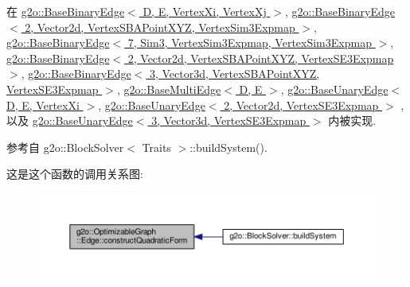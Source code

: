 在 \hyperlink{classg2o_1_1BaseBinaryEdge_a06a18745d95017c6d3c841f838a65364}{g2o\-::\-Base\-Binary\-Edge$<$ D, E, Vertex\-Xi, Vertex\-Xj $>$}, \hyperlink{classg2o_1_1BaseBinaryEdge_a06a18745d95017c6d3c841f838a65364}{g2o\-::\-Base\-Binary\-Edge$<$ 2, Vector2d, Vertex\-S\-B\-A\-Point\-X\-Y\-Z, Vertex\-Sim3\-Expmap $>$}, \hyperlink{classg2o_1_1BaseBinaryEdge_a06a18745d95017c6d3c841f838a65364}{g2o\-::\-Base\-Binary\-Edge$<$ 7, Sim3, Vertex\-Sim3\-Expmap, Vertex\-Sim3\-Expmap $>$}, \hyperlink{classg2o_1_1BaseBinaryEdge_a06a18745d95017c6d3c841f838a65364}{g2o\-::\-Base\-Binary\-Edge$<$ 2, Vector2d, Vertex\-S\-B\-A\-Point\-X\-Y\-Z, Vertex\-S\-E3\-Expmap $>$}, \hyperlink{classg2o_1_1BaseBinaryEdge_a06a18745d95017c6d3c841f838a65364}{g2o\-::\-Base\-Binary\-Edge$<$ 3, Vector3d, Vertex\-S\-B\-A\-Point\-X\-Y\-Z, Vertex\-S\-E3\-Expmap $>$}, \hyperlink{classg2o_1_1BaseMultiEdge_ae44ba0385d4dda4bc038d81e50cadd8c}{g2o\-::\-Base\-Multi\-Edge$<$ D, E $>$}, \hyperlink{classg2o_1_1BaseUnaryEdge_ad7e6dc44c571be159f066bdb961ade2b}{g2o\-::\-Base\-Unary\-Edge$<$ D, E, Vertex\-Xi $>$}, \hyperlink{classg2o_1_1BaseUnaryEdge_ad7e6dc44c571be159f066bdb961ade2b}{g2o\-::\-Base\-Unary\-Edge$<$ 2, Vector2d, Vertex\-S\-E3\-Expmap $>$} , 以及 \hyperlink{classg2o_1_1BaseUnaryEdge_ad7e6dc44c571be159f066bdb961ade2b}{g2o\-::\-Base\-Unary\-Edge$<$ 3, Vector3d, Vertex\-S\-E3\-Expmap $>$} 内被实现.



参考自 g2o\-::\-Block\-Solver$<$ Traits $>$\-::build\-System().



这是这个函数的调用关系图\-:
\nopagebreak
\begin{figure}[H]
\begin{center}
\leavevmode
\includegraphics[width=350pt]{classg2o_1_1OptimizableGraph_1_1Edge_a56fbf3430ddf591e3c619bdd1b7e4499_icgraph}
\end{center}
\end{figure}


